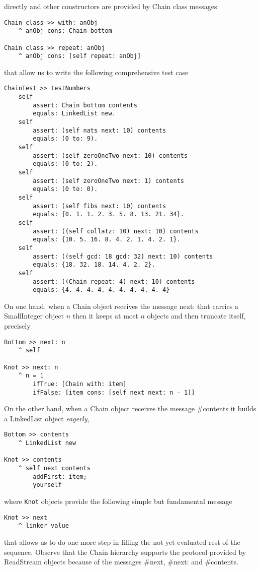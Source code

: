 \documentclass[a4paper,11pt]{article}
\newcommand{\ct}[1]{{\textsf{#1}}\xspace}
\begin{document}
directly and other constructors are provided by \ct{Chain} class messages
\begin{verbatim}
Chain class >> with: anObj
    ^ anObj cons: Chain bottom

Chain class >> repeat: anObj
    ^ anObj cons: [self repeat: anObj]
\end{verbatim}
that allow us to write the following comprehensive test case
\begin{verbatim}
ChainTest >> testNumbers
    self
        assert: Chain bottom contents
        equals: LinkedList new.
    self
        assert: (self nats next: 10) contents
        equals: (0 to: 9).
    self
        assert: (self zeroOneTwo next: 10) contents
        equals: (0 to: 2).
    self
        assert: (self zeroOneTwo next: 1) contents
        equals: (0 to: 0).
    self
        assert: (self fibs next: 10) contents
        equals: {0. 1. 1. 2. 3. 5. 8. 13. 21. 34}.
    self
        assert: ((self collatz: 10) next: 10) contents
        equals: {10. 5. 16. 8. 4. 2. 1. 4. 2. 1}.
    self
        assert: ((self gcd: 18 gcd: 32) next: 10) contents
        equals: {18. 32. 18. 14. 4. 2. 2}.
    self
        assert: ((Chain repeat: 4) next: 10) contents
        equals: {4. 4. 4. 4. 4. 4. 4. 4. 4. 4}
\end{verbatim}

On one hand, when a \ct{Chain} object receives the message
\ct{next:} that carries a \ct{SmallInteger} object $n$ then it keeps at most
$n$ objects and then truncate itself, precisely
\begin{verbatim}
Bottom >> next: n
    ^ self

Knot >> next: n
    ^ n = 1
        ifTrue: [Chain with: item]
        ifFalse: [item cons: [self next next: n - 1]]
\end{verbatim}

On the other hand, when a \ct{Chain} object receives the message
\ct{\#contents} it builds a \ct{LinkedList} object \textit{eagerly},
\begin{verbatim}
Bottom >> contents
    ^ LinkedList new

Knot >> contents
    ^ self next contents
        addFirst: item;
        yourself
\end{verbatim}
where \Verb|Knot| objects provide the following simple but fundamental message
\begin{verbatim}
Knot >> next
    ^ linker value
\end{verbatim}
that allows us to do one more step in filling the not yet evaluated rest of the
sequence. Observe that the \ct{Chain} hierarchy supports the protocol provided
by \ct{ReadStream} objects because of the messages \ct{\#next}, \ct{\#next:}
and \ct{\#contents}.
\end{document}
